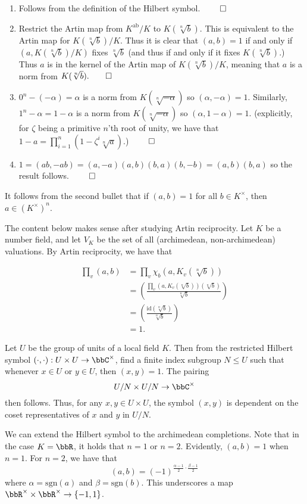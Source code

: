 \documentclass[a4paper, 12pt,oneside,openany]{book}
\begin{document}
 \begin{enumerate}
	\item Follows from the definition of the Hilbert symbol. $\qed$
	\item Restrict the Artin map from $K^{\text{ab}}/K$ to $K(\sqrt[n]{b})$. This is equivalent to the Artin map for $K(\sqrt[n]{b})/K$. Thus it is clear that $(a, b)=1$ if and only if $(a, K(\sqrt[n]{b})/K)$ fixes $\sqrt[n]{b}$ (and thus if and only if it fixes $K(\sqrt[n]{b})$.) Thus $a$ is in the kernel of the Artin map of $K(\sqrt[n]{b})/K$, meaning that $a$ is a norm from $K(\sqrt[n]{b}). \qed$
	\item $0^n -(-\alpha)=\alpha$ is a norm from $K(\sqrt[n]{-\alpha})$ so $(\alpha, -\alpha)=1$. Similarly, $1^n-\alpha = 1-\alpha$ is a norm from $K(\sqrt[n]{-\alpha})$ so $(\alpha, 1-\alpha)=1$. (explicitly, for $\zeta$ being a primitive $n$'th root of unity, we have that $1-a = \prod\limits_{i=1}^n (1-\zeta^i \sqrt[n]{a})$.) $\qed$
	\item $1 = (ab, -ab) = (a, -a)(a, b)(b, a)(b, -b) = (a, b)(b, a)$ so the result follows. $\qed$
\end{enumerate}

It follows from the second bullet that if $(a, b) = 1$ for all $b \in K^\times$, then $a \in (K^\times)^n$.

The content below makes sense after studying Artin reciprocity. Let $K$ be a number field, and let $V_K$ be the set of all (archimedean, non-archimedean) valuations. By Artin reciprocity, we have that 

\begin{align*}
	\prod\limits_v (a, b)&= \prod\limits_v \chi_b (a, K_v(\sqrt[n]{b}))  \\
	&= \left( \frac{\prod_v (a, K_v(\sqrt[n]{b}))(\sqrt[n]{b})}{\sqrt[n]{b}} \right) \\
	&= \left(\frac{\text{id}(\sqrt[n]{b})}{\sqrt[n]{b}} \right) \\
	&= 1.
\end{align*}

Let $U$ be the group of units of a local field $K$. Then from the restricted Hilbert symbol $(\cdot, \cdot): U \times U \to \bbC^\times$, find a finite index subgroup $N \leq U$ such that whenever $x \in U$ or $y \in U$, then $(x, y) = 1$. The pairing $$U/N \times U/N \to \bbC^\times$$ then follows. Thus, for any $x, y \in U\times U$, the symbol $(x, y)$ is dependent on the coset representatives of $x$ and $y$ in $U/N$. 

We can extend the Hilbert symbol to the archimedean completions. Note that in the case $K=\bbR$, it holds that $n=1$ or $n=2$. Evidently, $(a, b)=1$ when $n=1$. For $n=2$, we have that $$(a, b) = (-1)^{\frac{\alpha-1}{2} \cdot \frac{\beta-1}{2}}$$ where $\alpha = \text{sgn}(a)$ and $\beta = \text{sgn}(b)$. This underscores a map $\bbR^\times \times \bbR^\times \to \{-1, 1\}$.
\end{document}
